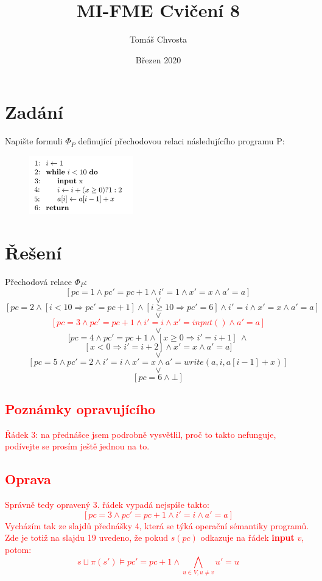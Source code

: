 \documentclass{article}
\title{MI-FME Cvičení 8}
\author{Tomáš Chvosta}
\date{Březen 2020}
\begin{document}
\maketitle

\section{Zadání}
Napište formuli $\Phi_P$ definující přechodovou relaci následujícího programu P:
\begin{figure}[H]
    \centering
    \includegraphics[width=0.4\textwidth]{code.png}
\end{figure}

\section{Řešení}

Přechodová relace $\Phi_P$:
$$[pc=1 \wedge pc' = pc + 1 \wedge i' = 1 \wedge x' = x \wedge a' = a ]$$
$$\lor$$
$$[pc=2 \wedge [i<10 \Rightarrow pc' = pc + 1] \wedge [i \geq 10 \Rightarrow pc' = 6] \wedge i' = i \wedge x' = x \wedge a' = a]$$
$$\lor$$
\textcolor{red}{$$[pc = 3 \wedge pc' = pc + 1 \wedge i' = i \wedge x' = input() \wedge a' = a ]$$}
$$\lor$$
$$[pc = 4 \wedge pc' = pc + 1 \wedge [x \geq 0 \Rightarrow i' = i + 1] \ \wedge$$
$$ [x < 0 \Rightarrow i' = i + 2] \wedge x' = x \wedge a' = a ]$$
$$\lor$$
$$[pc = 5 \wedge pc' = 2 \wedge i' = i \wedge x' = x \wedge a' = write(a, i, a[i-1] + x) ]$$
$$\lor$$
$$[pc = 6 \wedge \bot]$$

\textcolor{red}{\section{Poznámky opravujícího} Řádek 3: na přednášce jsem podrobně vysvětlil, proč to takto nefunguje, podívejte se prosím ještě jednou na to.}

\textcolor{red}{\section{Oprava} Správně tedy opravený 3. řádek vypadá nejspíše takto: $$[pc = 3 \wedge pc' = pc + 1 \wedge i' = i \wedge a' = a ]$$ Vycházím tak ze slajdů přednášky 4, která se týká operační sémantiky programů. Zde je totiž na slajdu 19 uvedeno, že pokud $s(pc)$ odkazuje na řádek \textbf{input} $v$, potom: $$ s \sqcup \pi(s') \models pc' = pc + 1 \wedge \bigwedge_{u \in V, u \neq v} u' = u $$}
\end{document}
